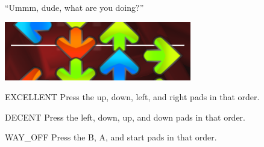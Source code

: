 ``Ummm, dude, what are you doing?''

\begin{center}
  \includegraphics{itg-udru.png}
\end{center}

\begin{switch}
\item{EXCELLENT}
  Press the up, down, left, and right pads in that order.
\item{DECENT}
  Press the left, down, up, and down pads in that order.
\item{WAY\_OFF}
  Press the B, A, and start pads in that order.
\end{switch}


